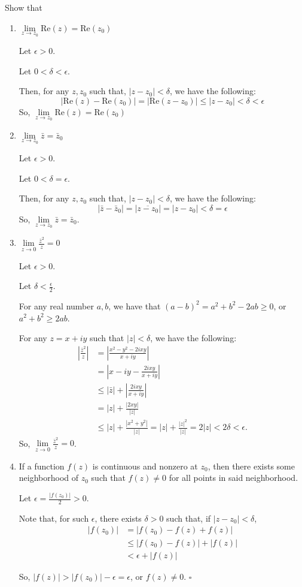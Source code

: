 \documentclass[12pt]{article}
\newcommand{\RE}{\mathrm{Re}}
\begin{document}
Show that

\begin{enumerate}
    \item $\lim\limits_{z\to z_0} \RE(z) = \RE(z_0)$

    Let $\epsilon > 0$.

    Let $0 < \delta < \epsilon$.

    Then, for any $z, z_0$ such that, $|z-z_0| < \delta$, we have the following:
    $$|\RE(z) - \RE(z_0)| = |\RE(z-z_0)| \le |z-z_0| < \delta < \epsilon$$
    So, $\lim\limits_{z\to z_0} \RE(z) = \RE(z_0)$

    \item $\lim\limits_{z\to z_0} \bar z = \bar z_0$

    Let $\epsilon > 0$.

    Let $0 < \delta  = \epsilon$.

    Then, for any $z, z_0$ such that, $|z-z_0| < \delta$, we have the following:
    $$|\bar z - \bar z_0| = |\overline{z-z_0}| = |z-z_0| < \delta = \epsilon$$
    So, $\lim\limits_{z\to z_0} \bar z = \bar z_0$.

    \item $\lim\limits_{z\to 0} \frac{\bar z^2}{z} = 0$
    
    Let $\epsilon > 0.$
    
    Let $\delta < \frac{\epsilon}{2}$.

    For any real number $a, b$, we have that $(a-b)^2 = a^2+b^2-2ab \geq 0$, or $a^2+b^2 \geq 2ab$.

    For any $z = x + iy$ such that $|z| < \delta$, we have the following:
    \begin{align*}
    |\frac{\bar z^2}{z}| &= |\frac{x^2-y^2-2ixy}{x+iy}|\\
    &= |x-iy - \frac{2ixy}{x+iy}|\\
    &\le |\bar z| + |\frac{2ixy}{x+iy}|\\
    &= |z| + \frac{|2xy|}{|z|}\\
    &\le |z| + \frac{|x^2+y^2|}{|z|} = |z| + \frac{|z|^2}{|z|} = 2|z| < 2\delta < \epsilon.
    \end{align*}
    So, $\lim\limits_{z\to 0} \frac{\bar z^2}{z} = 0$.
    \newpage
    
    \item If a function $f(z)$ is continuous and nonzero at $z_0$, then there exists some neighborhood of $z_0$ such that $f(z) \not = 0$ for all points in said neighborhood.

    Let $\epsilon = \frac{|f(z_0)|}{2} > 0$.
    
    Note that, for such $\epsilon$, there exists $\delta > 0$ such that, if $|z-z_0| < \delta$, 
    \begin{align*}
    |f(z_0)| &= |f(z_0) - f(z) + f(z)|\\
    &\le |f(z_0) - f(z)| + |f(z)|\\
    &< \epsilon + |f(z)|
    \end{align*}

    So, $|f(z)| > |f(z_0)| - \epsilon = \epsilon$, or $f(z) \not = 0$. $\square$
    
 \end{enumerate}
\end{document}
